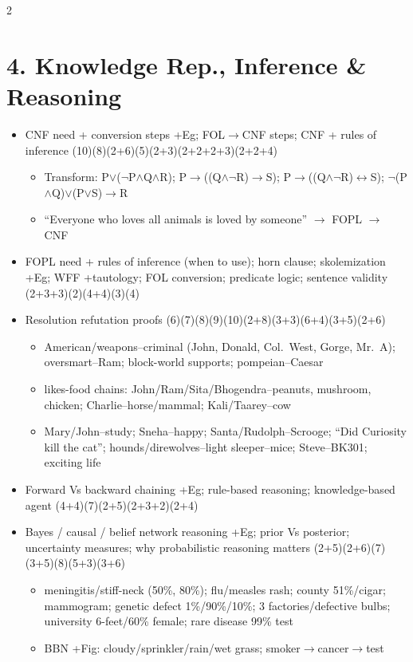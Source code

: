 \documentclass[10pt]{article}
\begin{document}
\begin{multicols}{2}
\section*{4. Knowledge Rep., Inference \& Reasoning}
\begin{itemize}
  \item CNF need + conversion steps +Eg; FOL$\to$CNF steps; CNF + rules of inference \hfill (10)(8)(2+6)(5)(2+3)(2+2+2+3)(2+2+4)
    \begin{itemize}
      \item Transform: P$\vee$($\neg$P$\wedge$Q$\wedge$R); P$\rightarrow$((Q$\wedge\neg$R)$\rightarrow$S); P$\rightarrow$((Q$\wedge\neg$R)$\leftrightarrow$S); $\neg$(P$\wedge$Q)$\vee$(P$\vee$S)$\rightarrow$R
      \item ``Everyone who loves all animals is loved by someone'' $\to$ FOPL $\to$ CNF
    \end{itemize}
  \item FOPL need + rules of inference (when to use); horn clause; skolemization +Eg; WFF +tautology; FOL conversion; predicate logic; sentence validity \hfill (2+3+3)(2)(4+4)(3)(4)
  \item Resolution refutation proofs \hfill (6)(7)(8)(9)(10)(2+8)(3+3)(6+4)(3+5)(2+6)
    \begin{itemize}
      \item American/weapons--criminal (John, Donald, Col.\ West, Gorge, Mr.\ A); oversmart--Ram; block-world supports; pompeian--Caesar
      \item likes-food chains: John/Ram/Sita/Bhogendra--peanuts, mushroom, chicken; Charlie--horse/mammal; Kali/Taarey--cow
      \item Mary/John--study; Sneha--happy; Santa/Rudolph--Scrooge; ``Did Curiosity kill the cat''; hounds/direwolves--light sleeper--mice; Steve--BK301; exciting life
    \end{itemize}
  \item Forward Vs backward chaining +Eg; rule-based reasoning; knowledge-based agent \hfill (4+4)(7)(2+5)(2+3+2)(2+4)
  \item Bayes / causal / belief network reasoning +Eg; prior Vs posterior; uncertainty measures; why probabilistic reasoning matters \hfill (2+5)(2+6)(7)(3+5)(8)(5+3)(3+6)
    \begin{itemize}
      \item meningitis/stiff-neck (50\%, 80\%); flu/measles rash; county 51\%/cigar; mammogram; genetic defect 1\%/90\%/10\%; 3 factories/defective bulbs; university 6-feet/60\% female; rare disease 99\% test
      \item BBN +Fig: cloudy/sprinkler/rain/wet grass; smoker$\to$cancer$\to$test
    \end{itemize}
\end{itemize}


\end{multicols}
\end{document}
